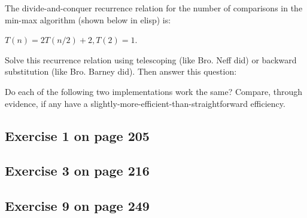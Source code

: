 \documentclass[12pt]{amsart}
\begin{document}
  The divide-and-conquer recurrence relation for the number of
  comparisons in the min-max algorithm (shown below in elisp) is:

  $T(n) = 2T(n/2) + 2, T(2) = 1$.

  Solve this recurrence relation using telescoping (like Bro. Neff did) or backward substitution (like Bro. Barney did). Then answer this question:

  Do each of the following two implementations work the same? Compare, through evidence, if any have a slightly-more-efficient-than-straightforward efficiency.


\lstset{language=C++}


\lstset{language=Swift}
  
\subsection{Exercise 1 on page 205} 
\subsection{Exercise 3 on page 216}
\subsection{Exercise 9 on page 249}
\end{document}
